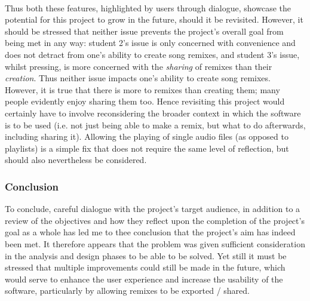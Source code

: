 \paragraph{}
Thus both these features, highlighted by users through dialogue, showcase the potential for this project to grow in the future, should it be revisited. However, it should be stressed that neither issue prevents the project's overall goal from being met in any way: student 2's issue is only concerned with convenience and does not detract from one's ability to create song remixes, and student 3's issue, whilst pressing, is more concerned with the \textit{sharing} of remixes than their \textit{creation}. Thus neither issue impacts one's ability to create song remixes. However, it is true that there is more to remixes than creating them; many people evidently enjoy sharing them too. Hence revisiting this project would certainly have to involve reconsidering the broader context in which the software is to be used (i.e. not just being able to make a remix, but what to do afterwards, including sharing it). Allowing the playing of single audio files (as opposed to playlists) is a simple fix that does not require the same level of reflection, but should also nevertheless be considered.

\subsubsection*{Conclusion}
To conclude, careful dialogue with the project's target audience, in addition to a review of the objectives and how they reflect upon the completion of the project's goal as a whole has led me to thee conclusion that the project's aim has indeed been met. It therefore appears that the problem was given sufficient consideration in the analysis and design phases to be able to be solved. Yet still it must be stressed that multiple improvements could still be made in the future, which would serve to enhance the user experience and increase the usability of the software, particularly by allowing remixes to be exported / shared.